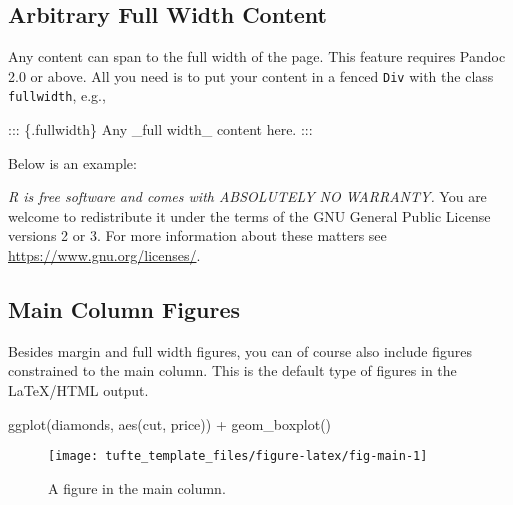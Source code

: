 \documentclass[a4paper,14pt]{tufte-handout}
\newenvironment{Shaded}{}{}
\newcommand{\FunctionTok}[1]{\textcolor[rgb]{0.02,0.16,0.49}{#1}}
\newcommand{\NormalTok}[1]{#1}
\newcommand{\SpecialCharTok}[1]{\textcolor[rgb]{0.25,0.44,0.63}{#1}}
\begin{document}
\hypertarget{arbitrary-full-width-content}{%
\subsection{Arbitrary Full Width
Content}\label{arbitrary-full-width-content}}

Any content can span to the full width of the page. This feature
requires Pandoc 2.0 or above. All you need is to put your content in a
fenced \texttt{Div} with the class \texttt{fullwidth}, e.g.,

\begin{Shaded}
\begin{Highlighting}[]
\NormalTok{::: \{.fullwidth\}}
\NormalTok{Any \_full width\_ content here.}
\NormalTok{:::}
\end{Highlighting}
\end{Shaded}

Below is an example:

\emph{R is free software and comes with ABSOLUTELY NO WARRANTY.} You are
welcome to redistribute it under the terms of the GNU General Public
License versions 2 or 3. For more information about these matters see
\url{https://www.gnu.org/licenses/}.

\hypertarget{main-column-figures}{%
\subsection{Main Column Figures}\label{main-column-figures}}

Besides margin and full width figures, you can of course also include
figures constrained to the main column. This is the default type of
figures in the LaTeX/HTML output.

\begin{Shaded}
\begin{Highlighting}[numbers=left,,]
\FunctionTok{ggplot}\NormalTok{(diamonds, }\FunctionTok{aes}\NormalTok{(cut, price)) }\SpecialCharTok{+} \FunctionTok{geom\_boxplot}\NormalTok{()}
\end{Highlighting}
\end{Shaded}

\begin{figure}

{\centering \texttt{[image: tufte\_template\_files/figure-latex/fig-main-1]} 

}

\caption[A figure in the main column]{A figure in the main column.}\label{fig:fig-main}
\end{figure}
\end{document}
